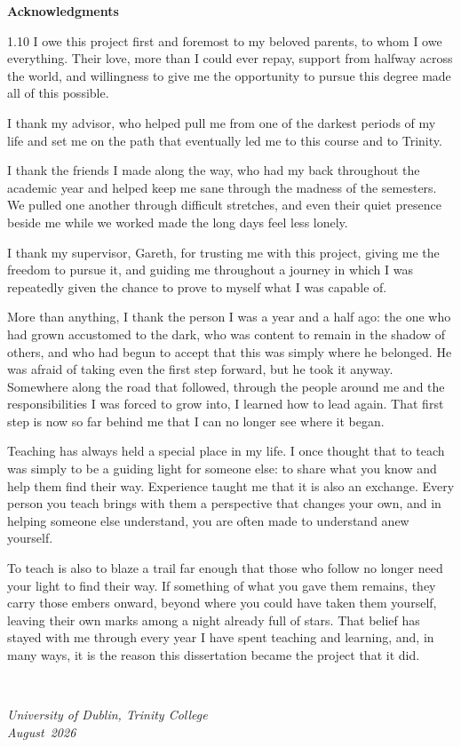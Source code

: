 \documentclass[a4paper,12pt,oneside]{report}
\renewcommand{\thesisuniversity}{University of Dublin, Trinity College}
\renewcommand{\thesisauthor}{Priyansh Nayak}
\renewcommand{\thesismonth}{August}
\renewcommand{\thesisyear}{2026}
\renewenvironment{thesisacknowledgments}
    {\clearpage
     \thispagestyle{plain}
     \addcontentsline{toc}{chapter}{Acknowledgments}
     \vspace*{8mm}
     {\noindent\Huge\bfseries Acknowledgments\par}
     \vspace{8mm}
     \begin{spacing}{1.10}\noindent}
    {\end{spacing}
     \par \vspace{14mm}
     \raggedleft {\large \textsc{\thesisauthor}} \\[8mm]
     \raggedright {\slshape \thesisuniversity \\ \thesismonth\ \thesisyear}
     \newpage}
\begin{document}
\begin{thesisacknowledgments}
I owe this project first and foremost to my beloved parents, to whom I owe everything. Their love, more than I could ever repay, support from halfway across the world, and willingness to give me the opportunity to pursue this degree made all of this possible.

I thank my advisor, who helped pull me from one of the darkest periods of my life and set me on the path that eventually led me to this course and to Trinity.

I thank the friends I made along the way, who had my back throughout the academic year and helped keep me sane through the madness of the semesters. We pulled one another through difficult stretches, and even their quiet presence beside me while we worked made the long days feel less lonely.

I thank my supervisor, Gareth, for trusting me with this project, giving me the freedom to pursue it, and guiding me throughout a journey in which I was repeatedly given the chance to prove to myself what I was capable of.

More than anything, I thank the person I was a year and a half ago: the one who had grown accustomed to the dark, who was content to remain in the shadow of others, and who had begun to accept that this was simply where he belonged. He was afraid of taking even the first step forward, but he took it anyway. Somewhere along the road that followed, through the people around me and the responsibilities I was forced to grow into, I learned how to lead again. That first step is now so far behind me that I can no longer see where it began.

Teaching has always held a special place in my life. I once thought that to teach was simply to be a guiding light for someone else: to share what you know and help them find their way. Experience taught me that it is also an exchange. Every person you teach brings with them a perspective that changes your own, and in helping someone else understand, you are often made to understand anew yourself.

To teach is also to blaze a trail far enough that those who follow no longer need your light to find their way. If something of what you gave them remains, they carry those embers onward, beyond where you could have taken them yourself, leaving their own marks among a night already full of stars. That belief has stayed with me through every year I have spent teaching and learning, and, in many ways, it is the reason this dissertation became the project that it did.
\end{thesisacknowledgments}
\end{document}
